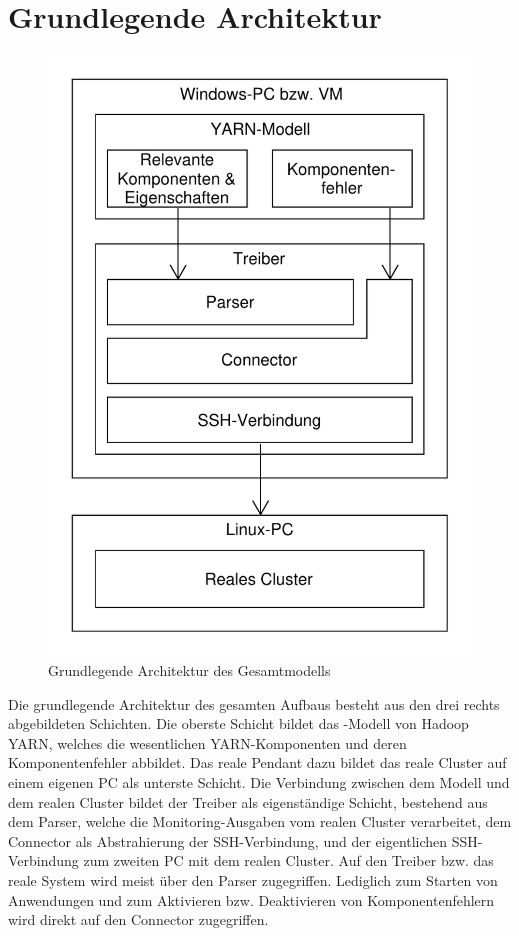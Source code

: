 \section{Grundlegende Architektur}\label{sec:architecture}

\begin{figure}
	\centering
	\includegraphics[width=0.5\columnwidth]{./images/modelArchitecture.pdf}
	\caption{Grundlegende Architektur des Gesamtmodells}
	\label{fig:modelArchitecture}
\end{figure}

Die grundlegende Architektur des gesamten Aufbaus besteht aus den drei rechts abgebildeten Schichten. Die oberste Schicht bildet das \sS-Modell von Hadoop YARN, welches die wesentlichen YARN-Komponenten und deren Komponentenfehler abbildet. Das reale Pendant dazu bildet das reale Cluster auf einem eigenen PC als unterste Schicht. Die Verbindung zwischen dem Modell und dem realen Cluster bildet der Treiber als eigenständige Schicht, bestehend aus dem Parser, welche die Monitoring-Ausgaben vom realen Cluster verarbeitet, dem Connector als Abstrahierung der SSH-Verbindung, und der eigentlichen SSH-Verbindung zum zweiten PC mit dem realen Cluster. Auf den Treiber bzw. das reale System wird meist über den Parser zugegriffen. Lediglich zum Starten von Anwendungen und zum Aktivieren bzw. Deaktivieren von Komponentenfehlern wird direkt auf den Connector zugegriffen.